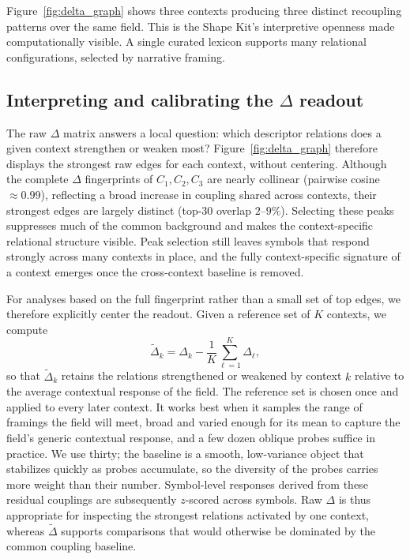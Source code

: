 \documentclass[final,creativeai]{article}
\begin{document}
Figure~\ref{fig:delta_graph} shows three contexts producing three distinct recoupling patterns over the same field. This is the Shape Kit's interpretive openness made computationally visible. A single curated lexicon supports many relational configurations, selected by narrative framing.

\subsection{Interpreting and calibrating the $\Delta$ readout}

The raw $\Delta$ matrix answers a local question: which descriptor relations does a given context strengthen or weaken most? Figure~\ref{fig:delta_graph} therefore displays the strongest raw edges for each context, without centering. Although the complete $\Delta$ fingerprints of $C_1,C_2,C_3$ are nearly collinear (pairwise cosine $\approx 0.99$), reflecting a broad increase in coupling shared across contexts, their strongest edges are largely distinct (top-30 overlap $2$--$9\%$). Selecting these peaks suppresses much of the common background and makes the context-specific relational structure visible. Peak selection still leaves symbols that respond strongly across many contexts in place, and the fully context-specific signature of a context emerges once the cross-context baseline is removed.

For analyses based on the full fingerprint rather than a small set of top edges, we therefore explicitly center the readout. Given a reference set of $K$ contexts, we compute
\[
\widetilde{\Delta}_k
=
\Delta_k-\frac{1}{K}\sum_{\ell=1}^{K}\Delta_\ell ,
\]
so that $\widetilde{\Delta}_k$ retains the relations strengthened or weakened by context $k$ relative to the average contextual response of the field. The reference set is chosen once and applied to every later context. It works best when it samples the range of framings the field will meet, broad and varied enough for its mean to capture the field's generic contextual response, and a few dozen oblique probes suffice in practice. We use thirty; the baseline is a smooth, low-variance object that stabilizes quickly as probes accumulate, so the diversity of the probes carries more weight than their number. Symbol-level responses derived from these residual couplings are subsequently $z$-scored across symbols. Raw $\Delta$ is thus appropriate for inspecting the strongest relations activated by one context, whereas $\widetilde{\Delta}$ supports comparisons that would otherwise be dominated by the common coupling baseline.
\end{document}
